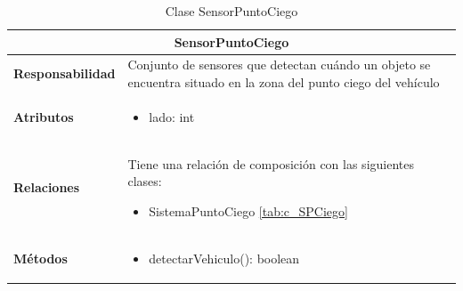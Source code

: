 \begin{table}[H]
\begin{center}
\begin{tabular}{p{} p{11cm}}
\multicolumn{2}{c}{\textbf{SensorPuntoCiego} } \\ \hline \hline
\textbf{Responsabilidad} &  Conjunto de sensores que detectan cuándo un objeto se encuentra situado en la zona del punto ciego del vehículo\\ \hline
\textbf{Atributos} &  \begin{itemize} \item lado: int \end{itemize}\\ \hline
\textbf{Relaciones} & \par Tiene una relación de composición con las siguientes clases:
                      \begin{itemize}
                        \item SistemaPuntoCiego \ref{tab:c_SPCiego}
                      \end{itemize}
                      \\ \hline

\textbf{Métodos} &  \begin{itemize}
                      \item detectarVehiculo(): boolean
                    \end{itemize}\\ \hline
\end{tabular}
\caption{Clase SensorPuntoCiego}
\label{tab:c_SensorPC}
\end{center}
\end{table}







